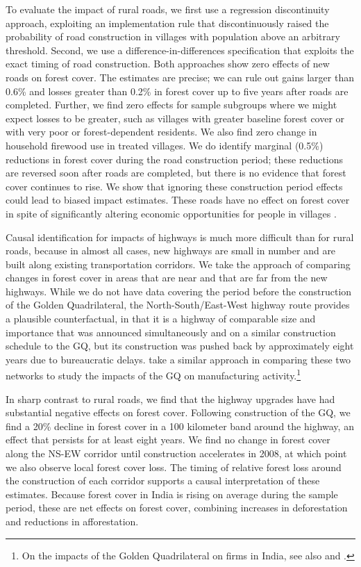 To evaluate the impact of rural roads, we first use a regression
discontinuity approach, exploiting an implementation rule that
discontinuously raised the probability of road construction in
villages with population above an arbitrary threshold.  Second, we use
a difference-in-differences specification that exploits the exact
timing of road construction. Both approaches show zero effects of new
roads on forest cover. The estimates are precise; we can rule out
gains larger than 0.6\% and losses greater than 0.2\% in forest cover
up to five years after roads are completed. Further, we find zero
effects for sample subgroups where we might expect losses to be
greater, such as villages with greater baseline forest cover or with
very poor or forest-dependent residents. We also find zero change in
household firewood use in treated villages. We do identify marginal
(0.5\%) reductions in forest cover during the road construction
period; these reductions are reversed soon after roads are completed,
but there is no evidence that forest cover continues to rise. We show
that ignoring these construction period effects could lead to biased
impact estimates. These roads have no effect on forest cover in spite
of significantly altering economic opportunities for people in
villages \cite{AN17,AAN17}.

Causal identification for impacts of highways is much more difficult
than for rural roads, because in almost all cases, new highways are
small in number and are built along existing transportation
corridors. We take the approach of comparing changes in forest cover
in areas that are near and that are far from the new highways. While
we do not have data covering the period before the construction of the
Golden Quadrilateral, the North-South/East-West highway route provides
a plausible counterfactual, in that it is a highway of comparable size
and importance that was announced simultaneously and on a similar
construction schedule to the GQ, but its construction was pushed back by
approximately eight years due to bureaucratic
delays.  take a similar approach in comparing these
two networks to study the impacts of the GQ on manufacturing
activity.\footnote{On the impacts of the Golden Quadrilateral on firms
  in India, see also  and .}

In sharp contrast to rural roads, we find that the highway upgrades
have had substantial negative effects on forest cover.  Following
construction of the GQ, we find a 20\% decline in forest cover in a
100 kilometer band around the highway, an effect that persists for at
least eight years. We find no change in forest cover along the NS-EW
corridor until construction accelerates in 2008, at which point we
also observe local forest cover loss. The timing of relative forest
loss around the construction of each corridor supports a causal
interpretation of these estimates.  Because forest cover in India is
rising on average during the sample period, these are net effects on
forest cover, combining increases in deforestation and reductions in
afforestation.

